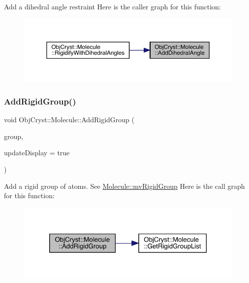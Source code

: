 Add a dihedral angle restraint Here is the caller graph for this function\+:
\nopagebreak
\begin{figure}[H]
\begin{center}
\leavevmode
\includegraphics[width=350pt]{class_obj_cryst_1_1_molecule_aae30adce9fdd16e42cab4f8e434f01cf_icgraph}
\end{center}
\end{figure}
\mbox{\label{class_obj_cryst_1_1_molecule_a8c61827ad3303aca5c0db6698a5f9e06}} 
\subsubsection{\texorpdfstring{AddRigidGroup()}{AddRigidGroup()}}
{\footnotesize\ttfamily void Obj\+Cryst\+::\+Molecule\+::\+Add\+Rigid\+Group (\begin{DoxyParamCaption}\item[{const \mbox{\hyperlink{class_obj_cryst_1_1_rigid_group}{Rigid\+Group}} \&}]{group,  }\item[{const bool}]{update\+Display = {\ttfamily true} }\end{DoxyParamCaption})}

Add a rigid group of atoms. See \mbox{\hyperlink{class_obj_cryst_1_1_molecule_a43939b3e3ad83065cf7ccb6065a53a12}{Molecule\+::mv\+Rigid\+Group}} Here is the call graph for this function\+:
\nopagebreak
\begin{figure}[H]
\begin{center}
\leavevmode
\includegraphics[width=320pt]{class_obj_cryst_1_1_molecule_a8c61827ad3303aca5c0db6698a5f9e06_cgraph}
\end{center}
\end{figure}
\mbox{\label{class_obj_cryst_1_1_molecule_a8700143ff56fc21bb1262c4d297802ce}} 
